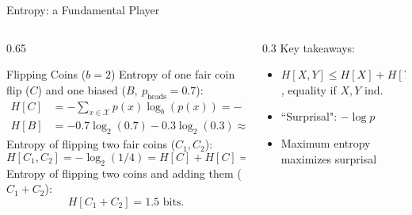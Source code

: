 \documentclass[10pt, aspectratio=169]{beamer}
\begin{document}
\begin{frame}{Entropy: a Fundamental Player}

\begin{columns}
	\begin{column}{0.65\textwidth}
	\begin{exampleblock}{Flipping Coins ($b=2$)}
		Entropy of one fair coin flip ($C$) and one biased ($B,~p_\text{heads}=0.7$):
	\begin{align}
		H[C] &= -\sum_{x \in \mathcal{X}} p(x) \log_b(p(x)) = -\log_2(1 / 2) = 1 \text{ bit.} \\
		H[B] &= -0.7\log_2(0.7) -0.3\log_2(0.3) \approx 0.88 \text{ bits.}
	\end{align}
	\pause
		Entropy of flipping two fair coins ($C_1, C_2$):
	\begin{equation}
		H[C_1, C_2] = -\log_2(1 / 4) = H[C] + H[C] = 2 \text{ bits.}
	\end{equation}
	\pause
		Entropy of flipping two coins and adding them ($C_1+C_2$):
	\begin{equation}
		H[C_1+C_2] = 1.5 \text{ bits.}
	\end{equation}
\end{exampleblock}
	\end{column}
	\hfill
	\pause
	\begin{column}{0.3\textwidth}
		Key takeaways:
		\vspace{10pt}
		\begin{itemize}\addtolength{\itemsep}{10pt}
			\item $H[X, Y] \le H[X] + H[Y]$, equality if $X, Y$ ind.
			\item ``Surprisal": $-\log p$
			\item \textcolor{red!80!black}{Maximum entropy maximizes surprisal}
		\end{itemize}
	\end{column}
\end{columns}


\end{frame}
\end{document}
